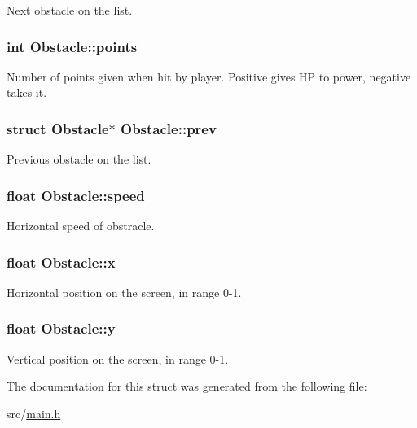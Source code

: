 \-Next obstacle on the list. \hypertarget{structObstacle_a38a164a0e4d6f6508fb65c6eff39147f}{
\subsubsection[{points}]{\setlength{\rightskip}{0pt plus 5cm}int {\bf \-Obstacle\-::points}}}\label{structObstacle_a38a164a0e4d6f6508fb65c6eff39147f}
\-Number of points given when hit by player. \-Positive gives \-H\-P to power, negative takes it. \hypertarget{structObstacle_a13bc07b730f58d5b1c3db68e8e4aca27}{
\subsubsection[{prev}]{\setlength{\rightskip}{0pt plus 5cm}struct {\bf \-Obstacle}$\ast$ {\bf \-Obstacle\-::prev}}}\label{structObstacle_a13bc07b730f58d5b1c3db68e8e4aca27}
\-Previous obstacle on the list. \hypertarget{structObstacle_a1e2b46db05325273ce0fcba3550b5b2a}{
\subsubsection[{speed}]{\setlength{\rightskip}{0pt plus 5cm}float {\bf \-Obstacle\-::speed}}}\label{structObstacle_a1e2b46db05325273ce0fcba3550b5b2a}
\-Horizontal speed of obstracle. \hypertarget{structObstacle_ad9cd25e0032f6692a4f93a057ccdfd85}{
\subsubsection[{x}]{\setlength{\rightskip}{0pt plus 5cm}float {\bf \-Obstacle\-::x}}}\label{structObstacle_ad9cd25e0032f6692a4f93a057ccdfd85}
\-Horizontal position on the screen, in range 0-\/1. \hypertarget{structObstacle_af4b6f012014e2fa5aef193330f70fdef}{
\subsubsection[{y}]{\setlength{\rightskip}{0pt plus 5cm}float {\bf \-Obstacle\-::y}}}\label{structObstacle_af4b6f012014e2fa5aef193330f70fdef}
\-Vertical position on the screen, in range 0-\/1. 

\-The documentation for this struct was generated from the following file\-:\begin{DoxyCompactItemize}
\item 
src/\hyperlink{main_8h}{main.\-h}\end{DoxyCompactItemize}
